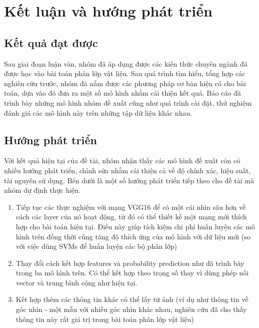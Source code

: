 \def\baselinestretch{1}
\chapter{Kết luận và hướng phát triển}
\ifpdf
    \graphicspath{{Conclusions/ConclusionsFigs/PNG/}{Conclusions/ConclusionsFigs/PDF/}{Conclusions/ConclusionsFigs/}}
\else
    \graphicspath{{Conclusions/ConclusionsFigs/EPS/}{Conclusions/ConclusionsFigs/}}
\fi

\def\baselinestretch{1.66}
\section{Kết quả đạt được}
Sau giai đoạn luận văn, nhóm đã áp dụng được các kiến thức chuyên ngành đã được học vào bài toán phân lớp vật liệu. Sau quá trình tìm hiểu, tổng hợp các nghiên cứu trước, nhóm đã nắm được các phương pháp cơ bản hiện có cho bài toán, dựa vào đó đưa ra một số mô hình nhằm cải thiện kết quả. Báo cáo đã trình bày những mô hình nhóm đề xuất cũng như quá trình cài đặt, thử nghiệm đánh giá các mô hình này trên những tập dữ liệu khác nhau.

\section{Hướng phát triển}
Với kết quả hiện tại của đề tài, nhóm nhận thấy các mô hình đề xuất còn có nhiều hướng phát triển, chỉnh sửa nhằm cải thiện cả về độ chính xác, hiệu suất, tài nguyên sử dụng. Bên dưới là một số hướng phát triển tiếp theo cho đề tài mà nhóm dự định thực hiện.
\begin{enumerate}
\item Tiếp tục các thực nghiệm với mạng VGG16 để có một cái nhìn sâu hơn về cách các layer của nó hoạt động, từ đó có thể thiết kế một mạng mới thích hợp cho bài toán hiện tại. Điều này giúp tích kiệm chi phí huấn luyện các mô hình trên đồng thời cũng tăng độ thích ứng của mô hình với dữ liệu mới (so với việc dùng SVMs để huấn luyện các bộ phân lớp)
\item Thay đổi cách kết hợp features và probability prediction như đã trình bày trong ba mô hình trên. Có thể kết hợp theo trọng số thay vì dùng phép nối vector và trung bình cộng như hiện tại.
\item Kết hợp thêm các thông tin khác có thể lấy từ ảnh (ví dụ như thông tin về góc nhìn - một mẫu với nhiều góc nhìn khác nhau, nghiên cứu \cite{xue2017differential} đã cho thấy thông tin này rất giá trị trong bài toán phân lớp vật liệu)
\end{enumerate}


